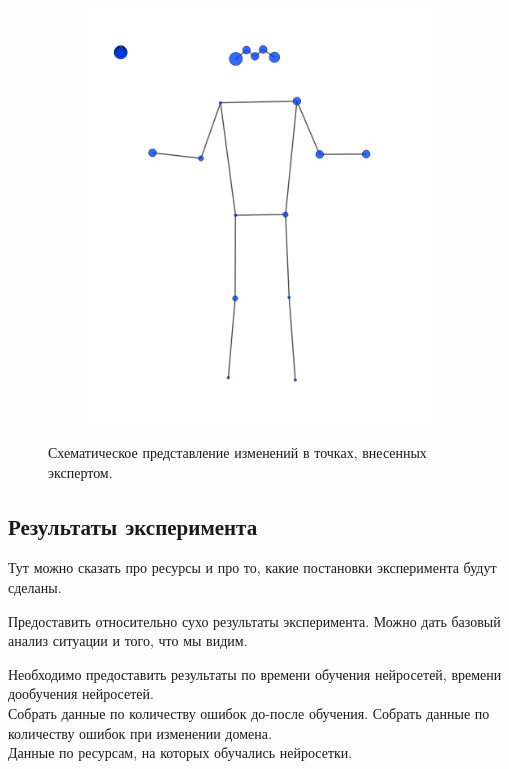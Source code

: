 \begin{figure}[h]
\begin{subfigure}[b]{0.4\textwidth}
	\includegraphics[width=\textwidth]{./images/data_info/pose_markup_examples/big_change_percentage}
	\caption{}
	\label{fig:big_correction}
\end{subfigure}
\caption{Схематическое представление изменений в точках, внесенных экспертом.}
\label{fig:correction_heatmap}
\end{figure}

\subsection{Результаты эксперимента}

Тут можно сказать про ресурсы и про то, какие постановки эксперимента будут сделаны.

Предоставить относительно сухо результаты эксперимента. Можно дать базовый анализ ситуации и того, что мы видим.

Необходимо предоставить результаты по времени обучения нейросетей, времени дообучения нейросетей. \\ 
Собрать данные по количеству ошибок до-после обучения. Собрать данные по количеству ошибок при изменении домена. \\ 
Данные по ресурсам, на которых обучались нейросетки.


\newpage